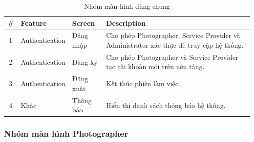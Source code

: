 \begin{table}[H]
	\centering
	\begin{tabular}{|c|p{3cm}|p{3cm}|p{7cm}|}
		\hline
		\textbf{\#} & \textbf{Feature} & \textbf{Screen} & \textbf{Description} \\
		\hline
		1 & Authentication & Đăng nhập &
		Cho phép Photographer, Service Provider và Administrator xác thực để truy cập hệ thống. \\
		\hline
		2 & Authentication & Đăng ký &
		Cho phép Photographer và Service Provider tạo tài khoản mới trên nền tảng. \\
		\hline
		3 & Authentication & Đăng xuất &
		Kết thúc phiên làm việc. \\
		\hline
		4 & Khác & Thông báo &
		Hiển thị danh sách thông báo hệ thống. \\
		\hline
	\end{tabular}
	\caption{Nhóm màn hình dùng chung}
	\label{tab:common-screen-descriptions}
\end{table}

\subsubsection{Nhóm màn hình Photographer}

